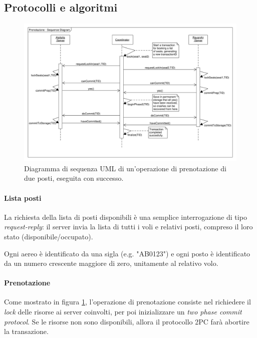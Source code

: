 \documentclass[a4paper]{article}
\begin{document}

\subsection{Protocolli e algoritmi}
\begin{figure}[t]
	\centering
		\includegraphics[width=\textwidth]{fig/reserve_sequence.pdf}
		\caption{Diagramma di sequenza UML di un'operazione di prenotazione di due posti, eseguita con successo.}
		\label{fig:bookseq}
\end{figure}

\paragraph{Lista posti}La richiesta della lista di posti disponibili è una semplice interrogazione di tipo \textit{request-reply}: il server invia la lista di tutti i voli e relativi posti, compreso il loro stato (disponibile/occupato).

Ogni aereo è identificato da una sigla (e.g. "AB0123") e ogni posto è identificato da un numero crescente maggiore di zero, unitamente al relativo volo.

\paragraph{Prenotazione}Come mostrato in figura \ref{fig:bookseq}, l'operazione di prenotazione consiste nel richiedere il \textit{lock} delle risorse ai server coinvolti, per poi inizializzare un \textit{two phase commit protocol}.
Se le risorse non sono disponibili, allora il protocollo 2PC farà abortire la transazione.
\end{document}

